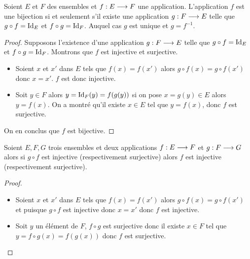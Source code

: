 \begin{theo}
    Soient \(E\) et \(F\) des ensembles et \(f:E \longrightarrow F\) une 
    application. L'application \(f\) est une bijection si et seulement s'il 
    existe une application \(g:F \longrightarrow E\) telle que \(g \circ f = 
    \operatorname{Id}_E\) et \(f \circ g = \operatorname{Id}_F\). Auquel cas \(g\) est unique et 
    \(g = f^{-1}\).
\end{theo}

\begin{proof}
    Supposons l'existence d'une application \(g:F \longrightarrow E\) telle que 
    \(g \circ f = \operatorname{Id}_E\) et \(f \circ g = \operatorname{Id}_F\). Montrons que \(f\) est 
    injective et surjective.
    \begin{itemize}
        \item Soient \(x\) et \(x'\) dans \(E\) tels que \(f(x) = f(x')\) alors 
            \(g \circ f(x) = g \circ f(x')\) donc \(x = x'\). \(f\) est donc 
            injective.
        \item Soit \(y \in F\) alors \(y = \operatorname{Id}_F(y) = f(g(y))\) si on pose \(x = g(y) 
            \in E\) alors \(y = f(x)\). On a montré qu'il existe \(x \in E\) tel 
            que \(y = f(x)\), donc \(f\) est surjective.
    \end{itemize}
    On en conclus que \(f\) est bijective.
\end{proof}

\begin{prop}
    Soient \(E, F, G\) trois ensembles et deux applications 
    \(f:E \longrightarrow F\) et \(g:F \longrightarrow G\) alors si \(g \circ f\) 
    est injective (respectivement surjective) alors \(f\) est injective 
    (respectivement surjective).
\end{prop}

\begin{proof}
    \begin{itemize}
        \item Soient \(x\) et \(x'\) dans \(E\) tels que \(f(x) = f(x')\) alors 
            \(g \circ f(x) = g \circ f(x')\) et puisque \(g \circ f\) est 
            injective donc \(x = x'\) donc \(f\) est injective.
        \item Soit \(y\) un élément de \(F\), \(f \circ g\) est surjective donc 
            il existe \(x \in F\) tel que \(y = f \circ g(x) = f(g(x))\) donc 
            \(f\) est surjective.
    \end{itemize}
\end{proof}

